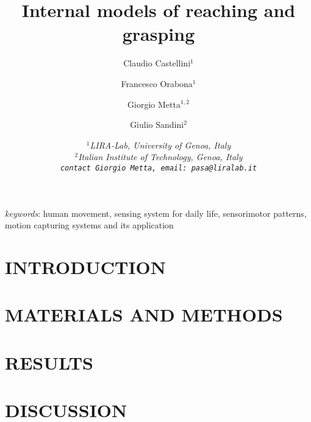 \documentclass{arsubmit}
\title{Internal models of reaching and grasping}
\author{Claudio Castellini$^1$ \and Francesco Orabona$^1$ \and Giorgio Metta$^{1,2}$ \and Giulio Sandini$^2$}
\date{\small \it{
$^1$LIRA-Lab, University of Genoa, Italy\\
$^2$Italian Institute of Technology, Genoa, Italy\\
{\tt contact Giorgio Metta, email: pasa@liralab.it}
}}
\begin{document}
\maketitle

\begin{abstract}

\end{abstract}

{\it keywords}: human movement, sensing system for daily life,
sensorimotor patterns, motion capturing systems and its application

\section{INTRODUCTION}
\label{sec:introduction}


%

\section{MATERIALS AND METHODS}
\label{sec:exp_desc}


\section{RESULTS}
\label{sec:exp_res}


\section{DISCUSSION}
\label{sec:Conclusions}


{\small


}
\end{document}
